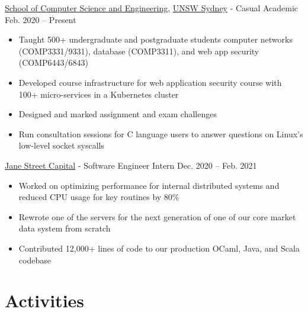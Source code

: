 \documentclass[hidelinks__VERSION__]{adamyi-cv}
\begin{document}
\begin{entrylist}


\entry
{\href{https://www.cse.unsw.edu.au/}{School of Computer Science and Engineering}, \href{https://unsw.edu.au/}{UNSW Sydney} - Casual Academic}
{Feb. 2020 -- Present}
{
\begin{minipage}[t]{1\linewidth}
\begin{itemize}[leftmargin=*,align=left,noitemsep]
\item Taught 500+ undergraduate and postgraduate students computer networks (COMP3331/9331), database (COMP3311), and web app security (COMP6443/6843)
\item Developed course infrastructure for web application security course with 100+ micro-services in a Kubernetes cluster
\item Designed and marked assignment and exam challenges
\item Run consultation sessions for C language users to answer questions on Linux's low-level socket syscalls
\end{itemize}
\end{minipage}
}


\entry
{\href{https://www.janestreet.com/}{Jane Street Capital} - Software Engineer Intern}
{Dec. 2020 -- Feb. 2021}
{
\begin{minipage}[t]{1\linewidth}
\begin{itemize}[leftmargin=*,align=left,noitemsep]
\item Worked on optimizing performance for internal distributed systems and reduced CPU usage for key routines by 80\%
\item Rewrote one of the servers for the next generation of one of our core market data system from scratch
\item Contributed 12,000+ lines of code to our production OCaml, Java, and Scala codebase
\end{itemize}
\end{minipage}
}

\end{entrylist}


\section{Activities}
\end{document}
